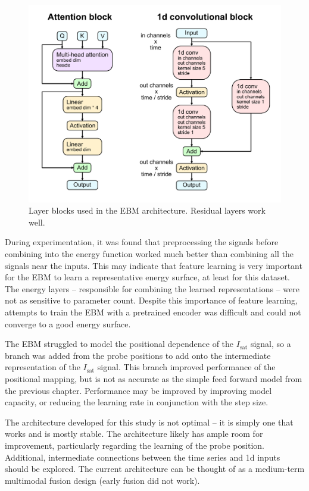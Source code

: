 \begin{figure}
	\centering
	\includegraphics[width=\linewidth]{figures/architecture_blocks.pdf}
	\caption{\label{fig:architecture_blocks}Layer blocks used in the EBM architecture. Residual layers work well.}
\end{figure}

During experimentation, it was found that preprocessing the signals before combining into the energy function worked much better than combining all the signals near the inputs. This may indicate that feature learning is very important for the EBM to learn a representative energy surface, at least for this dataset. The energy layers -- responsible for combining the learned representations -- were not as sensitive to parameter count. Despite this importance of feature learning, attempts to train the EBM with a pretrained encoder was difficult and could not converge to a good energy surface.

The EBM struggled to model the positional dependence of the $I_\text{sat}$ signal, so a branch was added from the probe positions to add onto the intermediate representation of the $I_\text{sat}$ signal. This branch improved performance of the positional mapping, but is not as accurate as the simple feed forward model from the previous chapter. Performance may be improved by improving model capacity, or reducing the learning rate in conjunction with the step size. 

The architecture developed for this study is not optimal -- it is simply one that works and is mostly stable. The architecture likely has ample room for improvement, particularly regarding the learning of the probe position. Additional, intermediate connections between the time series and 1d inputs should be explored. The current architecture can be thought of as a medium-term multimodal fusion design (early fusion did not work). 


